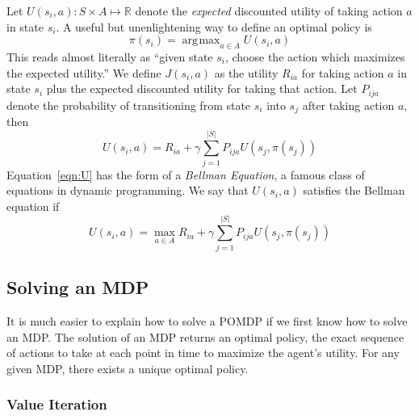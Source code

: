 \documentclass[tog]{acmsiggraph}
\DeclareMathOperator*{\argmax}{\arg\!\max}
\begin{document}
Let $U \left( s_i, a \right) : S \times A \mapsto \mathbb{R}$ denote the \textit{expected} 
discounted utility of taking action $a$ in state $s_i$. A useful but unenlightening 
way to define an optimal policy is
\begin{equation*}
  \pi \left(s_i \right) = \argmax_{a \in A} U \left( s_i, a \right)
\end{equation*}
This reads almost literally as ``given state $s_i$, choose the action which maximizes 
the expected utility.'' We define $J \left( s_i, a \right)$ as the utility $R_{ia}$ for 
taking action $a$ in state $s_i$ plus the expected discounted utility for taking that 
action. Let $P_{ija}$ denote the probability of transitioning from state $s_i$ into $s_j$ 
after taking action $a$, then
\begin{equation} \label{eqn:U}
  U \left( s_i, a \right) = R_{ia} + \gamma \sum_{j=1}^{\left| S \right|} P_{ija} U \left( s_j, \pi \left( s_j \right) \right)
\end{equation}
Equation~\ref{eqn:U} has the form of a \textit{Bellman Equation}, a famous class of equations in dynamic programming.
We say that $U \left( s_i, a \right)$ satisfies the Bellman equation if
\begin{equation*}
  U \left( s_i, a \right) = \max_{a \in A} R_{ia} + \gamma \sum_{j=1}^{\left| S \right|} P_{ija} U \left( s_j, \pi \left( s_j \right) \right)
\end{equation*}

\subsection{Solving an MDP}
It is much easier to explain how to solve a POMDP if we first know how to solve an MDP.\@
The solution of an MDP returns an optimal policy, the exact sequence of actions to take 
at each point in time to maximize the agent's utility. For any given MDP, there exists a 
unique optimal policy.

\subsubsection{Value Iteration}
\end{document}
